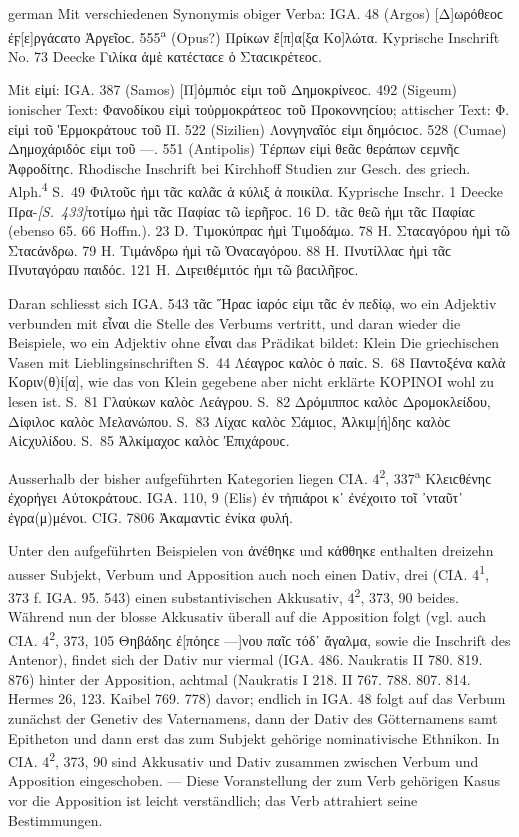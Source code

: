 \begin{otherlanguage*}{german}
Mit verschiedenen Synonymis obiger Verba: IGA. 48 (Argos) [Δ]ωρόθεοϲ ἐ\-ϝ[ε]ρ\-γά\-ϲα\-το Ἀργεῖοϲ. 555\textsuperscript{a} (Opus?) Πρίκων ἔ[π]α[ξα Κο]λώτα. Kyprische Inschrift No. 73 Deecke Γιλίκα ἁμὲ κατέϲταϲε ὁ Σταϲικρέτεοϲ.

Mit εἰμί: IGA. 387 (Samos) [Π]όμπιόϲ εἰμι τοῦ Δημοκρίνεοϲ. 492 (Sigeum) ionischer Text: Φανοδίκου εἰμὶ τοὐρμοκράτεοϲ τοῦ Προκοννηϲίου; attischer Text: Φ. εἰμὶ τοῦ Ἑρμοκράτουϲ τοῦ Π. 522 (Sizilien) Λονγηναῖόϲ εἰμι δημόϲιοϲ. 528 (Cumae) Δημοχάριδόϲ εἰμι τοῦ —. 551 (Antipolis) Τέρπων εἰμὶ θεᾶϲ θεράπων ϲεμνῆϲ Ἀφροδίτηϲ. Rhodische Inschrift bei Kirchhoff Studien zur Gesch. des griech. Alph.\textsuperscript{4} S.~49 Φιλτοῦϲ ἠμι τᾶϲ καλᾶϲ ἁ κύλιξ ἁ ποικίλα. Kyprische Inschr. 1 Deecke Πρα-\hypertarget{p433}{\emph{[S.~433]}}\label{p433}τοτίμω ἠμὶ τᾶϲ Παφίαϲ τῶ ἰερῆϝοϲ. 16 D. tᾶϲ θεῶ ἠμι τᾶϲ Παφίαϲ (ebenso 65. 66 Hoffm.). 23 D. Τιμοκύπραϲ ἠμὶ Τιμοδάμω. 78 Η. Σταϲαγόρου ἠμὶ τῶ Σταϲάνδρω. 79 Η. Τιμάνδρω ἠμὶ τῶ Ὀναϲαγόρου. 88 Η. Πνυτίλλαϲ ἠμὶ τᾶϲ Πνυταγόραυ παιδόϲ. 121 Η. Διϝειθέμιτόϲ ἠμι τῶ βαϲιλῆϝοϲ.

Daran schliesst sich IGA. 543 τᾶϲ Ἥραϲ ἱαρόϲ εἰμι τᾶϲ ἐν πεδίῳ, wo ein Adjektiv verbunden mit εἶναι die Stelle des Verbums vertritt, und daran wieder die Beispiele, wo ein Adjektiv ohne εἶναι das Prädikat bildet: Klein Die griechischen Vasen mit Lieblingsinschriften S.~44 Λέαγροϲ καλὸϲ ὁ παίϲ. S.~68 Παντοξένα καλὰ Κοριν(θ)ί[α], wie das von Klein gegebene aber nicht erklärte ΚΟΡΙΝΟΙ wohl zu lesen ist. S.~81 Γλαύκων καλὸϲ Λεάγρου. S.~82 Δρόμιπποϲ καλὸϲ Δρομοκλείδου, Δίφιλοϲ καλὸϲ Μελανώπου. S.~83 Λίχαϲ καλὸϲ Σάμιοϲ, Ἀλκιμ[ή]δηϲ καλὸϲ Αἰϲχυλίδου. S.~85 Ἀλκίμαχοϲ καλὸϲ Ἐπιχάρουϲ.

Ausserhalb der bisher aufgeführten Kategorien liegen CIA. 4\textsuperscript{2}, 337\textsuperscript{a} Κλειϲθένηϲ ἐχορήγει Αὐτοκράτουϲ. IGA. 110, 9 (Elis) ἐν τἠπιάροι κ᾽ ἐνέχοιτο τοῖ ᾽νταῦτ᾽ ἐγρα(μ)μένοι. CIG. 7806 Ἀκαμαντὶϲ ἐνίκα φυλή.

Unter den aufgeführten Beispielen von ἀνέθηκε und κάθθηκε enthalten dreizehn ausser Subjekt, Verbum und Apposition auch noch einen Dativ, drei (CIA. 4\textsuperscript{1}, 373 f. IGA. 95. 543) einen substantivischen Akkusativ, 4\textsuperscript{2}, 373, 90 beides. Während nun der blosse Akkusativ überall auf die Apposition folgt (vgl. auch CIA. 4\textsuperscript{2}, 373, 105 Θηβάδηϲ ἐ[πόηϲε —]νου παῖϲ τόδ᾽ ἄγαλμα, sowie die Inschrift des Antenor), findet sich der Dativ nur viermal (IGA. 486. Naukratis II 780. 819. 876) hinter der Apposition, achtmal (Naukratis I 218. II 767. 788. 807. 814. Hermes 26, 123. Kaibel 769. 778) davor; endlich in IGA. 48 folgt auf das Verbum zunächst der Genetiv des Vaternamens, dann der Dativ des Götternamens samt Epitheton und dann erst das zum Subjekt gehörige nominativische Ethnikon. In CIA. 4\textsuperscript{2}, 373, 90 sind Akkusativ und Dativ zusammen zwischen Verbum und Apposition eingeschoben. — Diese Voranstellung der zum Verb gehörigen Kasus vor die Apposition ist leicht verständlich; das Verb attrahiert seine Bestimmungen.


\end{otherlanguage*}
